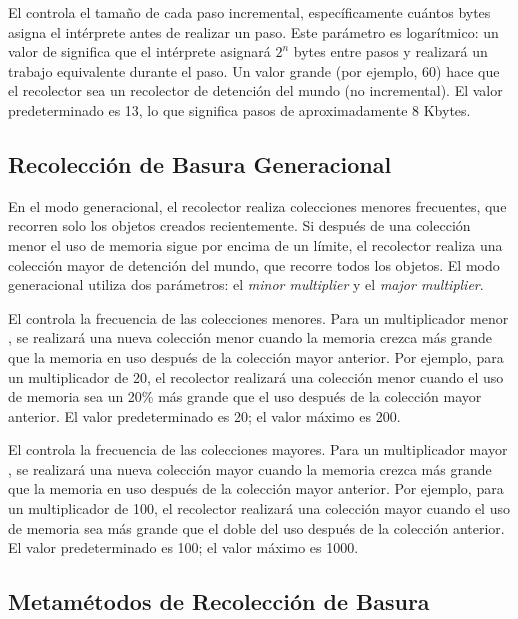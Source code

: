 El  controla el tamaño de cada paso incremental, específicamente cuántos bytes asigna el intérprete antes de realizar un paso. Este parámetro es logarítmico: un valor de  significa que el intérprete asignará $2^n$ bytes entre pasos y realizará un trabajo equivalente durante el paso. Un valor grande (por ejemplo, 60) hace que el recolector sea un recolector de detención del mundo (no incremental). El valor predeterminado es 13, lo que significa pasos de aproximadamente 8 Kbytes.

\subsection{Recolección de Basura Generacional}

En el modo generacional, el recolector realiza colecciones menores frecuentes, que recorren solo los objetos creados recientemente. Si después de una colección menor el uso de memoria sigue por encima de un límite, el recolector realiza una colección mayor de detención del mundo, que recorre todos los objetos. El modo generacional utiliza dos parámetros: el \textit{minor multiplier} y el \textit{major multiplier}.

El  controla la frecuencia de las colecciones menores. Para un multiplicador menor , se realizará una nueva colección menor cuando la memoria crezca  más grande que la memoria en uso después de la colección mayor anterior. Por ejemplo, para un multiplicador de 20, el recolector realizará una colección menor cuando el uso de memoria sea un 20\% más grande que el uso después de la colección mayor anterior. El valor predeterminado es 20; el valor máximo es 200.

El  controla la frecuencia de las colecciones mayores. Para un multiplicador mayor , se realizará una nueva colección mayor cuando la memoria crezca  más grande que la memoria en uso después de la colección mayor anterior. Por ejemplo, para un multiplicador de 100, el recolector realizará una colección mayor cuando el uso de memoria sea más grande que el doble del uso después de la colección anterior. El valor predeterminado es 100; el valor máximo es 1000.

\subsection{Metamétodos de Recolección de Basura}


